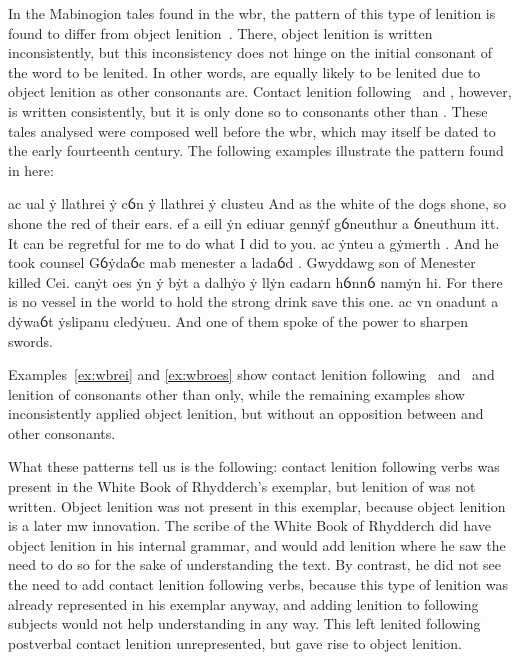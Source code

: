 In the Mabinogion tales found in the \gls{wbr}, the pattern of this type of lenition is found to differ from object lenition~\autocite[42, 69--70]{van_development14}. There, object lenition is written inconsistently, but this inconsistency does not hinge on the initial consonant of the word to be lenited. In other words,  are equally likely to be lenited due to object lenition as other consonants are. Contact lenition following \ei\ and \oes, however, is written consistently, but it is only done so to consonants other than . These tales analysed were composed well before the \gls{wbr}, which may itself be dated to the early fourteenth century. The following examples illustrate the pattern found in here:
\begin{mwl}
  {ac ual ẏ llathrei  ẏ cỽn ẏ llathrei  ẏ clusteu}%
  {And as the white of the dogs shone, so shone the red of their ears.}%
  {ef a eill  ẏn ediuar gennẏf gỽneuthur a ỽneuthum itt.}%
  {It can be regretful for me to do what I did to you.}
  {ac ẏnteu a gẏmerth .}%
  {And he took counsel}
  {Gỽẏdaỽc mab menester a ladaỽd .}%
  {Gwyddawg son of Menester killed Cei.}
  {canẏt oes  ẏn ẏ bẏt a dalhẏo ẏ llẏn cadarn hỽnnỽ namẏn hi.}%
  {For there is no vessel in the world to hold the strong drink save this one.}%
  {ac vn onadunt a dẏwaỽt  ẏslipanu cledẏueu.}%
  {And one of them spoke of the power to sharpen swords.}
\end{mwl}
Examples~\ref{ex:wbrei} and \ref{ex:wbroes} show contact lenition following \ei\ and \oes\ and lenition of consonants other than  only, while the remaining examples show inconsistently applied object lenition, but without an opposition between  and other consonants.

What these patterns tell us is the following: contact lenition following verbs was present in the White Book of Rhydderch's exemplar, but lenition of  was not written. Object lenition was not present in this exemplar, because object lenition is a later \gls{mw} innovation. The scribe of the White Book of Rhydderch did have object lenition in his internal grammar, and would add lenition where he saw the need to do so for the sake of understanding the text. By contrast, he did not see the need to add contact lenition following verbs, because this type of lenition was already represented in his exemplar anyway, and adding lenition to following subjects would not help understanding in any way. This left lenited  following postverbal contact lenition unrepresented, but gave rise to object lenition.

